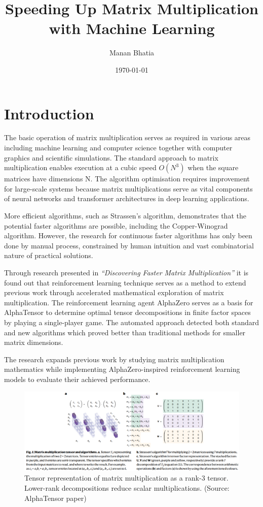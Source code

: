 \documentclass{article}
\title{Speeding Up Matrix Multiplication with Machine Learning}
\author{Manan Bhatia}
\date{\today}
\begin{document}
\maketitle

\section{Introduction}
The basic operation of matrix multiplication serves as required in various areas including machine learning and computer science together with computer graphics and scientific simulations. The standard approach to matrix multiplication enables execution at a cubic speed \( O(N^3) \) when the square matrices have dimensions N. The algorithm optimisation requires improvement for large-scale systems because matrix multiplications serve as vital components of neural networks and transformer architectures in deep learning applications.

More efficient algorithms, such as Strassen's algorithm, demonstrates that the potential faster algorithms are possible, including the Copper-Winograd algorithm. However, the research for continuous faster algorithms has only been done by manual process, constrained by human intuition and vast combinatorial nature of practical solutions.

Through research presented in \textit{“Discovering Faster Matrix Multiplication”} it is found out that reinforcement learning technique serves as a method to extend previous work through accelerated mathematical exploration of matrix multiplication. The reinforcement learning agent AlphaZero serves as a basis for AlphaTensor to determine optimal tensor decompositions in finite factor spaces by playing a single-player game. The automated approach detected both standard and new algorithms which proved better than traditional methods for smaller matrix dimensions.

The research expands previous work by studying matrix multiplication mathematics while implementing AlphaZero-inspired reinforcement learning models to evaluate their achieved performance.
\begin{figure}[H]
    \centering
    \includegraphics[width=0.6\linewidth]{Picture1.png}
    \caption{Tensor representation of matrix multiplication as a rank-3 tensor. Lower-rank decompositions reduce scalar multiplications. (Source: AlphaTensor paper)}
    \label{fig:tensor-representation}
\end{figure}
\end{document}
